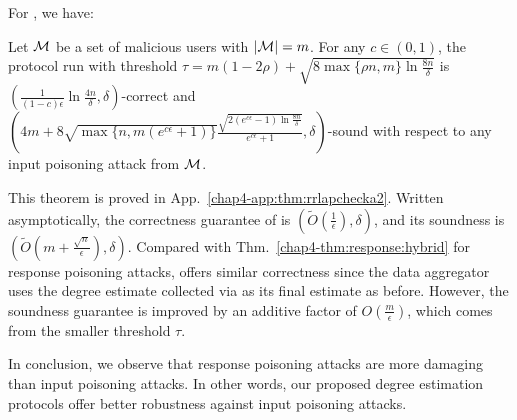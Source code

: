 For \DegHybrid{}, we have: 
\begin{thm}\label{chap4-thm:rrlapchecka2}
	Let $\mathcal{M}$ be a set of malicious users with $|\mathcal{M}| = m$. 
  For any $c \in (0,1)$, the \DegHybrid{} protocol run with threshold $\tau = m(1-2\rho) + \sqrt{8 \max\{\rho n, m\} \ln \frac{8n}{\delta}}$ is $(\frac{1}{(1-c)\epsilon}\ln \tfrac{4n}{\delta} ,\delta)$-correct and $(4m+8\sqrt{\max\{n, m(e^{c\epsilon}+1)\}}\frac{\sqrt{2(e^{c\epsilon}-1) \ln \frac{8n}{\delta}}}{e^{c\epsilon}+1}, \delta)$-sound with respect to any input poisoning attack from $\mathcal{M}$. \label{chap4-thm:input:hybrid}
\end{thm}
This theorem is proved in App.~\ref{chap4-app:thm:rrlapchecka2}.
Written asymptotically, the correctness guarantee of \DegHybrid{} is $(\tilde{O}(\frac{1}{\epsilon}), \delta)$, and its soundness is $(\tilde{O}(m + \frac{\sqrt{n}}{\epsilon}), \delta)$.
Compared with Thm.~\ref{chap4-thm:response:hybrid} for response poisoning attacks, \DegHybrid{} offers similar correctness since the data aggregator uses the degree estimate collected via \RLap{} as its final estimate as before. However, the soundness guarantee  is improved by an additive factor of $O(\frac{m}{\epsilon})$, which comes from the smaller threshold $\tau$. %

In conclusion, we observe that response poisoning attacks are more damaging than input poisoning attacks. In other words, our proposed degree estimation protocols offer better robustness against input poisoning attacks.


